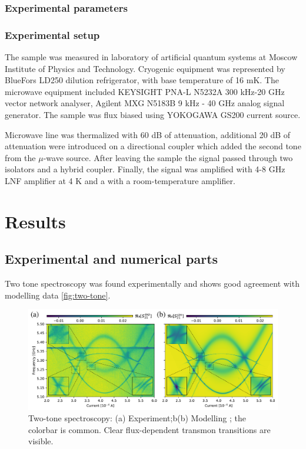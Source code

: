 \documentclass[%
 aip,
 amsmath,amssymb,
 reprint,%
]{revtex4-1}
\begin{document}
\subsubsection{Experimental parameters}
\subsubsection{Experimental setup}
The sample was measured in laboratory of artificial quantum systems at Moscow Institute of Physics and Technology. Cryogenic equipment was
represented by BlueFors LD250 dilution refrigerator, with base temperature of 16 mK. The microwave equipment included KEYSIGHT PNA-L N5232A 300 kHz-20 GHz vector network analyser, Agilent MXG N5183B 9 kHz - 40 GHz analog signal generator. The sample was 
flux biased using YOKOGAWA GS200 current source.

Microwave line was thermalized with 60 dB of attenuation, additional 20 dB of attenuation were introduced on a directional coupler which added the second tone from the $\mu$-wave source. After leaving the sample the signal passed through two isolators and a hybrid coupler. Finally, the signal was amplified with 4-8 GHz LNF amplifier at 4 K and a with a room-temperature amplifier.


\section{Results}

\subsection{\label{sec:level1} Experimental and numerical parts}

Two tone spectroscopy was found experimentally and shows good agreement with modelling data \autoref{fig:two-tone}. 

\begin{figure}

	\centering
	\includegraphics[width=\linewidth]{main_picture}
	\caption{Two-tone spectroscopy: (a) Experiment;b(b) Modelling ; the colorbar is common.  Clear flux-dependent transmon transitions are visible.}
	\label{fig:two-tone}
\end{figure}
\end{document}
